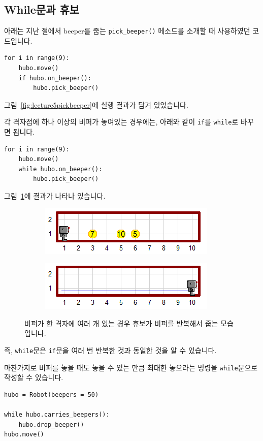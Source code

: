 \documentclass[../main.tex]{subfiles}
\begin{document}
\subsection{While문과 휴보}
아래는 지난 절에서 beeper를 줍는 \texttt{pick\_beeper()} 메소드를 소개할 때 사용하였던 코드입니다.
\begin{verbatim}
for i in range(9):
    hubo.move()
    if hubo.on_beeper():
        hubo.pick_beeper()
\end{verbatim}
그림~\ref{fig:lecture5pickbeeper}에 실행 결과가 담겨 있었습니다.

각 격자점에 하나 이상의 비퍼가 놓여있는 경우에는, 아래와 같이 \texttt{if}를 \texttt{while}로 바꾸면 됩니다.
\begin{verbatim}
for i in range(9):
    hubo.move()
    while hubo.on_beeper():
        hubo.pick_beeper()
      \end{verbatim}
그림~\ref{fig:lecture5pickbeepers}에 결과가 나타나 있습니다.
\begin{figure}[htbp]
\centering
\begin{subfigure}{.5\textwidth}
\centering
\includegraphics[width=.9\linewidth]{"./lectures/lecture5_whilepickbeeper"}
\end{subfigure}%
\begin{subfigure}{.5\textwidth}
\centering
\includegraphics[width=.9\linewidth]{"./lectures/lecture5_pickbeeperaft"}
\end{subfigure}
\caption{비퍼가 한 격자에 여러 개 있는 경우 휴보가 비퍼를 반복해서 줍는 모습입니다.}\label{fig:lecture5pickbeepers}
\end{figure}
즉, \texttt{while}문은 \texttt{if}문을 여러 번 반복한 것과 동일한 것을 알 수 있습니다.

마찬가지로 비퍼를 놓을 때도 놓을 수 있는 만큼 최대한 놓으라는 명령을 \texttt{while}문으로 작성할 수 있습니다.
\begin{verbatim}
hubo = Robot(beepers = 50)

while hubo.carries_beepers():
    hubo.drop_beeper()
hubo.move()
\end{verbatim}
\end{document}
